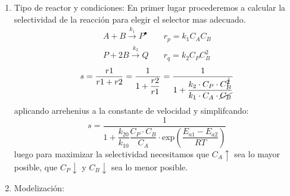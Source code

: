 \solve{}
\begin{enumerate}[label={\alph*)}]
	\item Tipo de reactor y condiciones:
	      \noindent En primer lugar procederemos a calcular la selectividad de la reacción para elegir el selector mas adecuado.
	      \begin{align*}
		      A +B \xrightarrow{k_1} P^{\bullet} \quad & r_p = k_1 C_A C_B   \\
		      P + 2B \xrightarrow{k_2} Q \quad         & r_q = k_2 C_P C_B^2
	      \end{align*}
	      \begin{equation*}
		      s = \frac{r1}{r1+r2} = \frac{1}{1+\dfrac{r2}{r1}}= \frac{1}{1+\dfrac{k_2\cdot C_P\cdot C_B^{\cancel{2}}}{k_1\cdot C_A \cdot \cancel{C_B}}}
	      \end{equation*}
	      aplicando arrehenius a la constante de velocidad y simplifcando:
	      \begin{equation}
		      s = \frac{1}{1+\dfrac{k_{20}}{k_{10}} \dfrac{C_P\cdot C_B}{C_A}\cdot \text{exp}\left(\dfrac{E_{a1}-E_{a2}}{RT}\right)}
	      \end{equation}
	      luego para maximizar la selectividad necesitamos que $C_A \uparrow$ sea lo mayor posible, que $C_P\downarrow$ y $C_B\downarrow$ sea lo menor posible.\\

	      \begin{center}
	      \end{center}
	\item Modelización:


\end{enumerate}
